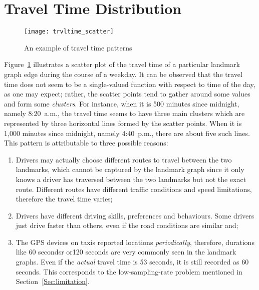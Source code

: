 \begin{table}[h!]
\centering
{}
\caption{An summary of landmark graphs}\label{Ta:ldmkgraphs}
\end{table}

\section{Travel Time Distribution}
\begin{figure}[h!]
\texttt{[image: trvltime\_scatter]}
\centering
\caption{An example of travel time patterns}\label{Fig:wrkd_50m_trvltime}
\end{figure}

Figure~\ref{Fig:wrkd_50m_trvltime} illustrates a scatter plot of the travel time of a particular landmark graph edge during the course of a weekday. It can be observed that the travel time does not seem to be a single-valued function with respect to time of the day, as one may expect; rather, the scatter points tend to gather around some values and form some \emph{clusters}. For instance, when it is 500 minutes since midnight, namely 8:20~a.m., the travel time seems to have three main clusters which are represented by three horizontal lines formed by the scatter points. When it is 1,000 minutes since midnight, namely 4:40~p.m., there are about five such lines. This pattern is attributable to three possible reasons:
\begin{enumerate}
\item Drivers may actually choose different routes to travel between the two landmarks, which cannot be captured by the landmark graph since it only knows a driver has traversed between the two landmarks but not the exact route. Different routes have different traffic conditions and speed limitations, therefore the travel time varies;
\item Drivers have different driving skills, preferences and behaviours. Some drivers just drive faster than others, even if the road conditions are similar and;
\item The GPS devices on taxis reported locations \emph{periodically}, therefore, durations like 60 secondsr or120 seconds are very commonly seen in the landmark graphs. Even if the \emph{actual} travel time is 53 seconds, it is still recorded as 60 seconds. This corresponds to the low-sampling-rate problem mentioned in Section~\ref{Sec:limitation}. 
\end{enumerate}

